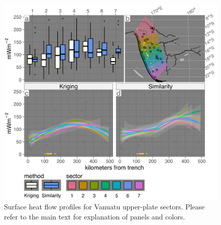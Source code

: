 \begin{figure}[htbp]

{\centering \includegraphics[width=1\linewidth,]{assets/figs/chpt3/VanuatuUpperPlate} 

}

\caption[Surface heat flow profiles for Vanuatu upper-plate sectors]{Surface heat flow profiles for Vanuatu upper-plate sectors. Please refer to the main text for explanation of panels and colors.}\label{fig:vanuatuUpper}
\end{figure}

\clearpage

\begingroup
\renewcommand{\arraystretch}{0.5}

\begingroup\fontsize{10}{12}\selectfont

